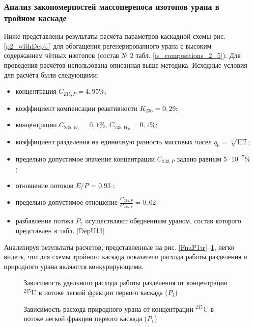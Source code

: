 \subsubsection{Анализ закономерностей массопереноса изотопов урана в тройном  каскаде}

Ниже представлены результаты расчёта параметров каскадной схемы рис. \ref{p2_withDepU} для обогащения регенерированного урана с высоким содержанием чётных изотопов (состав № 2 табл. \ref{is_compositions_2_5}). Для проведения расчётов использована описанная выше методика. Исходные условия для расчёта были следующими:

\begin{itemize}
    \item концентрация $C_{235,{P}} = {4,95\%}$; 
    \item коэффициент компенсации реактивности $K_{236}=0,29$;
    \item концентрации $C_{235,{W_1}} = 0,1\%$, $C_{235,{W_0}} = 0,1\%$;
    \item коэффициент разделения на единичную разность массовых чисел $q_{0} = \sqrt[3]{1,2}$;
    \item предельно допустимое значение концентрации $C_{232,{P}}$ задано равным $5\cdot10^{-7} \%$;
    \item отношение потоков $E/P$ = 0,93 ;
    \item предельно допустимое отношение $\frac{C_{234,{P}}}{C_{235,{P}}} = 0,02$.
    \item разбавление потока $P_2$ осуществляют обедненным ураном, состав которого представлен в табл. \ref{DepU13}
\end{itemize}

Анализируя результаты расчетов, представленные на  рис. \ref{FnuP1tr}--\ref{pFoP1tr}, легко видеть, что для схемы тройного каскада показатели расхода работы разделения и природного урана являются конкурирующими.

\begin{figure}[ht]
    \centering
    \begin{minipage}{.5\textwidth}
        \centering
        
  \caption{{Зависимость удельного расхода работы разделения от концентрации $^{235}$U в потоке легкой фракции первого каскада ($P_1$){\label{FnuP1tr}}}}
  \end{minipage}%
    \begin{minipage}{.5\textwidth}
      \centering
      
\caption{{Зависимость расхода природного урана от концентрации $^{235}$U в потоке легкой фракции первого каскада ($P_1$){\label{pFoP1tr}}}}
    \end{minipage}
\end{figure}

